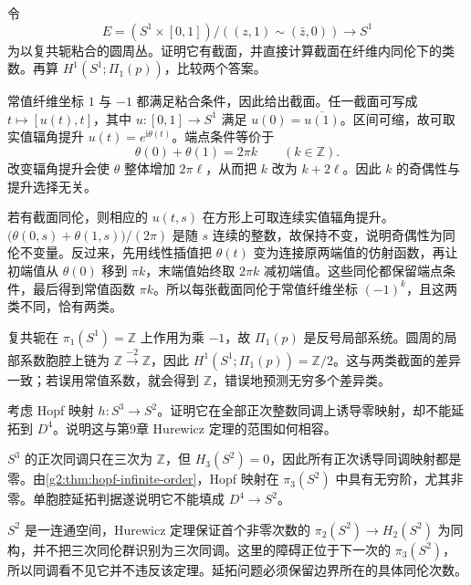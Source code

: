 \begin{exercise}\label{g2:ex:reflection-circle-sections}
	令
	\[
		E=(S^1\times[0,1])/((z,1)\sim(\bar z,0))\longrightarrow S^1
	\]
	为以复共轭粘合的圆周丛。证明它有截面，并直接计算截面在纤维内同伦下的类数。再算 \(H^1(S^1;\Pi_1(p))\)，比较两个答案。
\end{exercise}
\begin{solution}
	常值纤维坐标 \(1\) 与 \(-1\) 都满足粘合条件，因此给出截面。任一截面可写成 \(t\mapsto[u(t),t]\)，其中 \(u:[0,1]\to S^1\) 满足 \(u(0)=\overline{u(1)}\)。区间可缩，故可取实值辐角提升 \(u(t)=e^{\mathrm i\theta(t)}\)。端点条件等价于
	\[
		\theta(0)+\theta(1)=2\pi k\qquad(k\in\mathbb Z).
	\]
	改变辐角提升会使 \(\theta\) 整体增加 \(2\pi\ell\)，从而把 \(k\) 改为 \(k+2\ell\)。因此 \(k\) 的奇偶性与提升选择无关。

	若有截面同伦，则相应的 \(u(t,s)\) 在方形上可取连续实值辐角提升。\(\bigl(\theta(0,s)+\theta(1,s)\bigr)/(2\pi)\) 是随 \(s\) 连续的整数，故保持不变，说明奇偶性为同伦不变量。反过来，先用线性插值把 \(\theta(t)\) 变为连接原两端值的仿射函数，再让初端值从 \(\theta(0)\) 移到 \(\pi k\)，末端值始终取 \(2\pi k\) 减初端值。这些同伦都保留端点条件，最后得到常值函数 \(\pi k\)。所以每张截面同伦于常值纤维坐标 \((-1)^k\)，且这两类不同，恰有两类。

	复共轭在 \(\pi_1(S^1)=\mathbb Z\) 上作用为乘 \(-1\)，故 \(\Pi_1(p)\) 是反号局部系统。圆周的局部系数胞腔上链为 \(\mathbb Z\xrightarrow{-2}\mathbb Z\)，因此 \(H^1(S^1;\Pi_1(p))=\mathbb Z/2\)。这与两类截面的差异一致；若误用常值系数，就会得到 \(\mathbb Z\)，错误地预测无穷多个差异类。
\end{solution}

\begin{exercise}\label{g2:ex:homology-invisible-extension-obstruction}
	考虑 Hopf 映射 \(h:S^3\to S^2\)。证明它在全部正次整数同调上诱导零映射，却不能延拓到 \(D^4\)。说明这与第9章 Hurewicz 定理的范围如何相容。
\end{exercise}
\begin{solution}
	\(S^3\) 的正次同调只在三次为 \(\mathbb Z\)，但 \(H_3(S^2)=0\)，因此所有正次诱导同调映射都是零。由\cref{g2:thm:hopf-infinite-order}，Hopf 映射在 \(\pi_3(S^2)\) 中具有无穷阶，尤其非零。单胞腔延拓判据遂说明它不能填成 \(D^4\to S^2\)。

	\(S^2\) 是一连通空间，Hurewicz 定理保证首个非零次数的 \(\pi_2(S^2)\to H_2(S^2)\) 为同构，并不把三次同伦群识别为三次同调。这里的障碍正位于下一次的 \(\pi_3(S^2)\)，所以同调看不见它并不违反该定理。延拓问题必须保留边界所在的具体同伦次数。
\end{solution}

